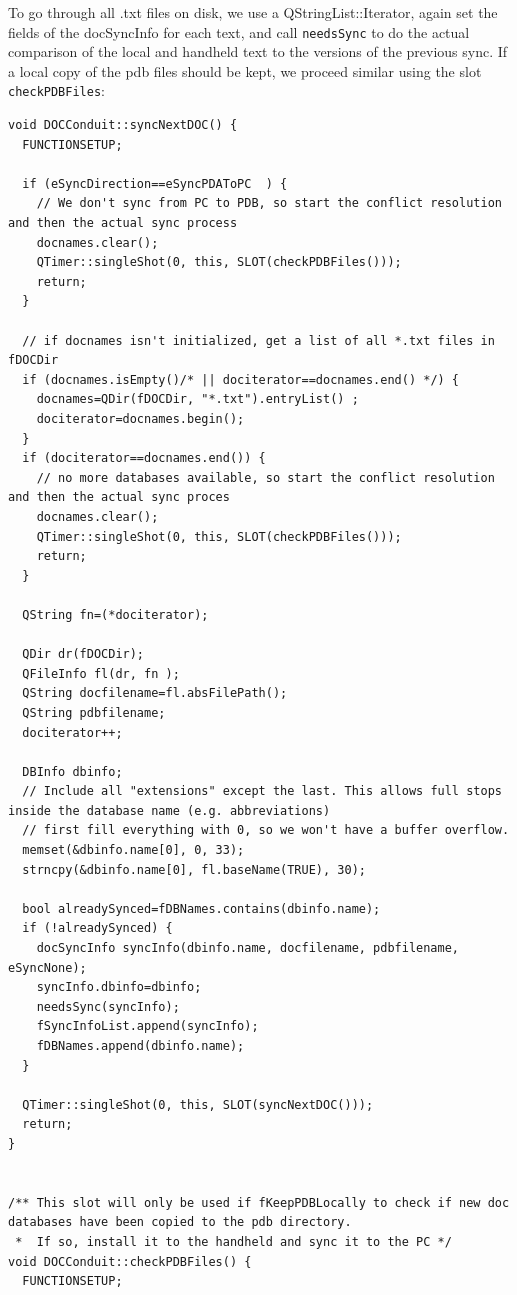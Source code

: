 \documentclass[10pt,a4paper]{article}
\newcommand{\code}[1]{{\small\texttt{#1}}}
\begin{document}
To go through all .txt files on disk, we use a QStringList::Iterator, again set the fields of the docSyncInfo for each text, and call \code{needsSync} to do the actual comparison of the local and handheld text to the versions of the previous sync. If a local copy of the pdb files should be kept, we proceed similar using the slot \code{checkPDBFiles}:

{\footnotesize
\begin{verbatim}
void DOCConduit::syncNextDOC() {
  FUNCTIONSETUP;
  
  if (eSyncDirection==eSyncPDAToPC  ) {
    // We don't sync from PC to PDB, so start the conflict resolution and then the actual sync process
    docnames.clear();
    QTimer::singleShot(0, this, SLOT(checkPDBFiles()));
    return;
  }
  
  // if docnames isn't initialized, get a list of all *.txt files in fDOCDir
  if (docnames.isEmpty()/* || dociterator==docnames.end() */) {
    docnames=QDir(fDOCDir, "*.txt").entryList() ;
    dociterator=docnames.begin();
  }
  if (dociterator==docnames.end()) {
    // no more databases available, so start the conflict resolution and then the actual sync proces
    docnames.clear();
    QTimer::singleShot(0, this, SLOT(checkPDBFiles()));
    return;
  }

  QString fn=(*dociterator);

  QDir dr(fDOCDir);
  QFileInfo fl(dr, fn );
  QString docfilename=fl.absFilePath();
  QString pdbfilename;
  dociterator++;
  
  DBInfo dbinfo;
  // Include all "extensions" except the last. This allows full stops inside the database name (e.g. abbreviations)
  // first fill everything with 0, so we won't have a buffer overflow.
  memset(&dbinfo.name[0], 0, 33);
  strncpy(&dbinfo.name[0], fl.baseName(TRUE), 30);

  bool alreadySynced=fDBNames.contains(dbinfo.name);
  if (!alreadySynced) {
    docSyncInfo syncInfo(dbinfo.name, docfilename, pdbfilename, eSyncNone);
    syncInfo.dbinfo=dbinfo;
    needsSync(syncInfo);
    fSyncInfoList.append(syncInfo);
    fDBNames.append(dbinfo.name);
  }
  
  QTimer::singleShot(0, this, SLOT(syncNextDOC()));
  return;
}


/** This slot will only be used if fKeepPDBLocally to check if new doc databases have been copied to the pdb directory.
 *  If so, install it to the handheld and sync it to the PC */
void DOCConduit::checkPDBFiles() {
  FUNCTIONSETUP;
  

\end{verbatim}}
\end{document}
